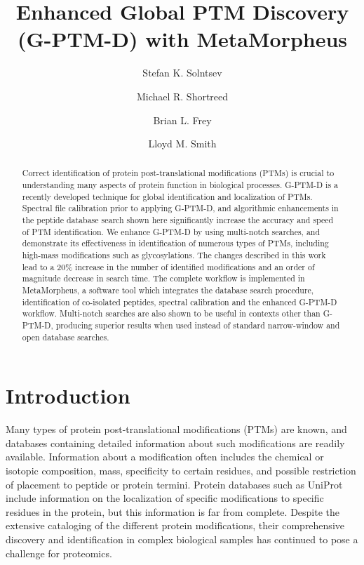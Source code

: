 \documentclass[journal=jprobs,manuscript=article]{achemso}
\author{Stefan K. Solntsev}
\author{Michael R. Shortreed}
\author{Brian L. Frey}
\author{Lloyd M. Smith}
\affiliation[UwMadison]
{University of Wisconsin-Madison}
\title[Enhanced Global PTM Discovery (G-PTM-D) with MetaMorpheus]
  {Enhanced Global PTM Discovery (G-PTM-D) with MetaMorpheus}
\begin{document}
	

\sloppy

\begin{abstract}

Correct identification of protein post-translational modifications (PTMs) is crucial to understanding many aspects of protein function in biological processes.
G-PTM-D is a recently developed technique for global identification and localization of PTMs.
Spectral file calibration prior to applying G-PTM-D, and algorithmic enhancements in the peptide database search shown here significantly increase the accuracy and speed of PTM identification.
We enhance G-PTM-D by using multi-notch searches, and demonstrate its effectiveness in identification of numerous types of PTMs, including high-mass modifications such as glycosylations.
The changes described in this work lead to a 20\% increase in the number of identified modifications and an order of magnitude decrease in search time.
The complete workflow is implemented in MetaMorpheus, a software tool which integrates the database search procedure, identification of co-isolated peptides, spectral calibration and the enhanced G-PTM-D workflow.
Multi-notch searches are also shown to be useful in contexts other than G-PTM-D, producing superior results when used instead of standard narrow-window and open database searches.
\end{abstract}

\section{Introduction}

Many types of protein post-translational modifications (PTMs) are known, and databases containing detailed information about such modifications are readily available\citep{Creasy_2004}.
Information about a modification often includes the chemical or isotopic composition, mass, specificity to certain residues, and possible restriction of placement to peptide or protein termini.
Protein databases such as UniProt\citep{Uniprot_2017} include information on the localization of specific modifications to specific residues in the protein, but this information is far from complete.
Despite the extensive cataloging of the different protein modifications, their comprehensive discovery and identification in complex biological samples has continued to pose a challenge for proteomics\citep{Olsen_2013}.
\end{document}
